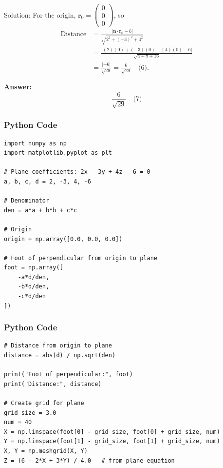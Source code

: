 \documentclass{beamer}
\begin{document}
\begin{frame}{Solution:}
For the origin, $\mathbf{r}_0 = \begin{pmatrix} 0 \\ 0 \\ 0 \end{pmatrix}$, so
\begin{equation}
\begin{split}
\text{Distance} &= \frac{|\mathbf{n} \cdot \mathbf{r}_0 - 6|}{\sqrt{2^2 + (-3)^2 + 4^2}} \\
&= \frac{|(2)(0) + (-3)(0) + (4)(0) - 6|}{\sqrt{4 + 9 + 16}} \\
&= \frac{|-6|}{\sqrt{29}} = \frac{6}{\sqrt{29}} \quad \text{(6)}.
\end{split}
\end{equation}

\vspace{0.5em}
\textbf{Answer:}
\begin{equation}
\boxed{\frac{6}{\sqrt{29}}} \quad \text{(7)}
\end{equation}
\end{frame}

\begin{frame}[fragile]
    \frametitle{Python Code}
    \begin{lstlisting}
import numpy as np
import matplotlib.pyplot as plt

# Plane coefficients: 2x - 3y + 4z - 6 = 0
a, b, c, d = 2, -3, 4, -6

# Denominator
den = a*a + b*b + c*c

# Origin
origin = np.array([0.0, 0.0, 0.0])

# Foot of perpendicular from origin to plane
foot = np.array([
    -a*d/den,
    -b*d/den,
    -c*d/den
])
\end{lstlisting}
\end{frame}


\begin{frame}[fragile]
    \frametitle{Python Code}
    \begin{lstlisting}
# Distance from origin to plane
distance = abs(d) / np.sqrt(den)

print("Foot of perpendicular:", foot)
print("Distance:", distance)

# Create grid for plane
grid_size = 3.0
num = 40
X = np.linspace(foot[0] - grid_size, foot[0] + grid_size, num)
Y = np.linspace(foot[1] - grid_size, foot[1] + grid_size, num)
X, Y = np.meshgrid(X, Y)
Z = (6 - 2*X + 3*Y) / 4.0   # from plane equation
\end{lstlisting}
\end{frame}
\end{document}
